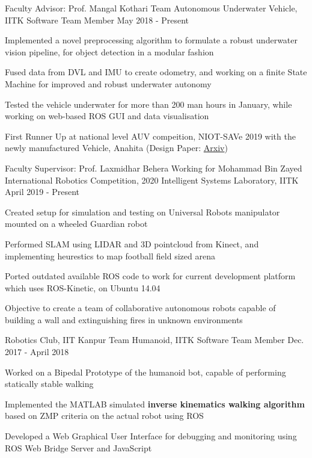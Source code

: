 
\begin{cventries}

  \cventry
    {Faculty Advisor: Prof. Mangal Kothari}
    {Team Autonomous Underwater Vehicle, IITK}
    {Software Team Member}
    {May 2018 - Present}
    {
      \begin{cvitems}
        \item {Implemented a novel preprocessing algorithm to formulate a robust underwater vision pipeline, for object detection in a modular fashion}
        \item {Fused data from DVL and IMU to create odometry, and working on a finite State Machine for improved and robust underwater autonomy}
        \item {Tested the vehicle underwater for more than 200 man hours in January, while working on web-based ROS GUI and data visualisation}
        \item {First Runner Up at national level AUV compeition, NIOT-SAVe 2019 with the newly manufactured Vehicle, Anahita (Design Paper: \href{https://arxiv.org/abs/1903.00494}{Arxiv})}
      \end{cvitems}
    }

  \cventry
    {Faculty Supervisor: Prof. Laxmidhar Behera}
    {Working for Mohammad Bin Zayed International Robotics Competition, 2020}
    {Intelligent Systems Laboratory, IITK}
    {April 2019 - Present}
    {
      \begin{cvitems}
        \item {Created setup for simulation and testing on Universal Robots manipulator mounted on a wheeled Guardian robot}
        \item {Performed SLAM using LIDAR and 3D pointcloud from Kinect, and implementing heurestics to map football field sized arena}
        \item {Ported outdated available ROS code to work for current development platform which uses ROS-Kinetic, on Ubuntu 14.04}
        \item {Objective to create a team of collaborative autonomous robots capable of building a wall and extinguishing fires in unknown environments}
      \end{cvitems}
    }  

    \cventry
    {Robotics Club, IIT Kanpur}
    {Team Humanoid, IITK}
    {Software Team Member}
    {Dec. 2017 - April 2018} 
    {
      \begin{cvitems} 
        \item {Worked on a Bipedal Prototype of the humanoid bot, capable of performing statically stable walking}
        \item {Implemented the MATLAB simulated \textbf{inverse kinematics walking algorithm} based on ZMP criteria on the actual robot using ROS}
        \item {Developed a Web Graphical User Interface for debugging and monitoring using ROS Web Bridge Server and JavaScript}
      \end{cvitems}
    }
\end{cventries}

